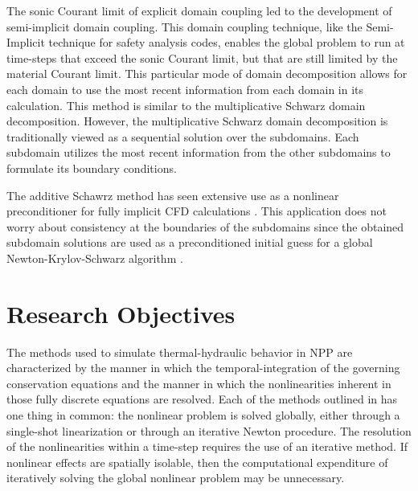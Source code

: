 The sonic Courant limit of explicit domain coupling led to the development of semi-implicit domain coupling.
This domain coupling technique, like the Semi-Implicit technique for safety analysis codes, enables the global problem to run at time-steps that exceed the sonic Courant limit, but that are still limited by the material Courant limit.
This particular mode of domain decomposition allows for each domain to use the most recent information from each domain in its calculation.
This method is similar to the multiplicative Schwarz domain decomposition.
However, the multiplicative Schwarz domain decomposition is traditionally viewed as a sequential solution over the subdomains.
Each subdomain utilizes the most recent information from the other subdomains to formulate its boundary conditions.

The additive Schawrz method has seen extensive use as a nonlinear preconditioner for fully implicit CFD calculations \cite{Cai2009, Cai2002}.
This application does not worry about consistency at the boundaries of the subdomains since the obtained subdomain solutions are used as a preconditioned initial guess for a global Newton-Krylov-Schwarz algorithm \cite{Chan1984}.


\section{Research Objectives}
The methods used to simulate thermal-hydraulic behavior in NPP are characterized by the manner in which the temporal-integration of the governing conservation equations and the manner in which the nonlinearities inherent in those fully discrete equations are resolved.
Each of the methods outlined in  has one thing in common: the nonlinear problem is solved globally, either through a single-shot linearization or through an iterative Newton procedure.
The resolution of the nonlinearities within a time-step requires the use of an iterative method.
If nonlinear effects are spatially isolable, then the computational expenditure of iteratively solving the global nonlinear problem may be unnecessary.

